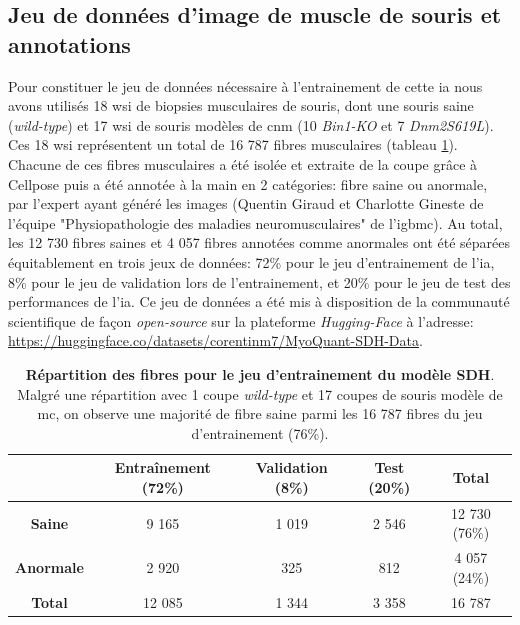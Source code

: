 \subsection{Jeu de données d'image de muscle de souris et annotations}
Pour constituer le jeu de données nécessaire à l'entrainement de cette \gls{ia} nous avons utilisés 18 \gls{wsi} de biopsies musculaires de souris, dont une souris saine (\textit{wild-type}) et 17 \gls{wsi} de souris modèles de \gls{cnm} (10 \textit{Bin1-KO} et 7 \textit{Dnm2S619L}). Ces 18 \gls{wsi} représentent un total de 16 787 fibres musculaires (tableau \ref{tab:sdh_fiber_count}). Chacune de ces fibres musculaires a été isolée et extraite de la coupe grâce à Cellpose puis a été annotée à la main en 2 catégories: fibre saine ou anormale, par l'expert ayant généré les images (Quentin Giraud et Charlotte Gineste de l'équipe "Physiopathologie des maladies neuromusculaires" de l'\gls{igbmc}). Au total, les 12 730 fibres saines et 4 057 fibres annotées comme anormales ont été séparées équitablement en trois jeux de données: 72\% pour le jeu d'entrainement de l'\gls{ia}, 8\% pour le jeu de validation lors de l'entrainement, et 20\% pour le jeu de test des performances de l'\gls{ia}. Ce jeu de données a été mis à disposition de la communauté scientifique de façon \textit{open-source} sur la plateforme \textit{Hugging-Face} à l'adresse: \href{https://huggingface.co/datasets/corentinm7/MyoQuant-SDH-Data}{https://huggingface.co/datasets/corentinm7/MyoQuant-SDH-Data}.

\begin{table}[htbp]
\centering
\caption[Répartition des fibres pour le jeu d'entrainement du modèle SDH]{\textbf{Répartition des fibres pour le jeu d'entrainement du modèle SDH}. Malgré une répartition avec 1 coupe \textit{wild-type} et 17 coupes de souris modèle de \gls{mc}, on observe une majorité de fibre saine parmi les 16 787 fibres du jeu d'entrainement (76\%).}
\label{tab:sdh_fiber_count}
\begin{tabular}{|c|c|c|c|c|}
\hline
 & \textbf{Entraînement} (72\%) & \textbf{Validation} (8\%) & \textbf{Test} (20\%) & \textbf{Total} \\
\hline
\textbf{Saine} & 9 165 & 1 019 & 2 546 & 12 730 (76\%) \\
\hline
\textbf{Anormale} & 2 920 & 325 & 812 & 4 057 (24\%) \\
\hline
\hline
\textbf{Total} & 12 085 & 1 344 & 3 358 & 16 787 \\
\hline
\end{tabular}
\end{table}


